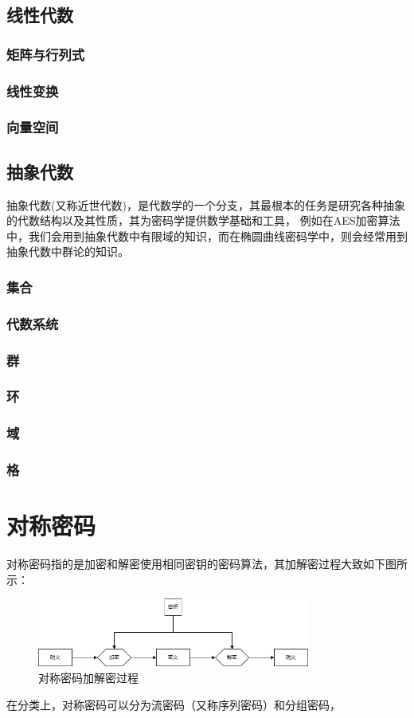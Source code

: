 \documentclass{article}
\numberwithin{equation}{subsubsection}
\begin{document}
\newpage
\subsection{线性代数}

\subsubsection{矩阵与行列式}
\subsubsection{线性变换}
\subsubsection{向量空间}

\newpage
\subsection{抽象代数}
抽象代数(又称近世代数)，是代数学的一个分支，其最根本的任务是研究各种抽象的代数结构以及其性质，其为密码学提供数学基础和工具，
例如在AES加密算法中，我们会用到抽象代数中有限域的知识，而在椭圆曲线密码学中，则会经常用到抽象代数中群论的知识。\par
\subsubsection{集合}

\subsubsection{代数系统}
\subsubsection{群}
\subsubsection{环}
\subsubsection{域}
\subsubsection{格}

\newpage
\section{对称密码}
对称密码指的是加密和解密使用相同密钥的密码算法，其加解密过程大致如下图所示：\par
\begin{figure}[h]
    \centering
    \includegraphics[width=0.8\textwidth]{Picture/Symmetric.png}
    \caption{对称密码加解密过程}
\end{figure}
在分类上，对称密码可以分为流密码（又称序列密码）和分组密码，
\end{document}
